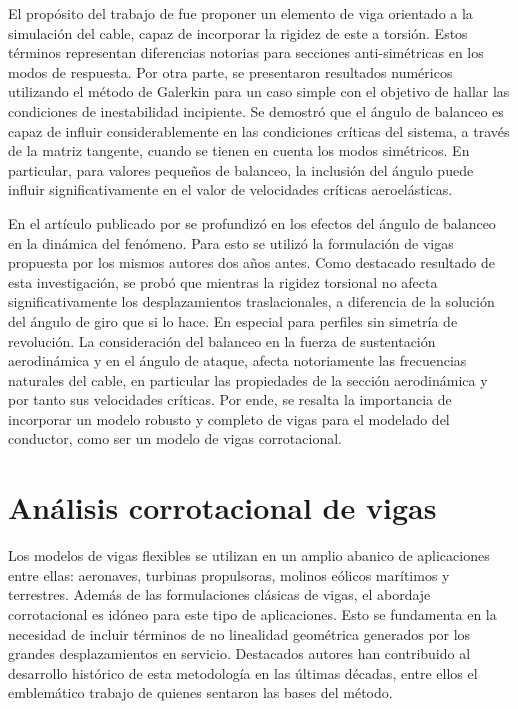 El propósito del trabajo de \cite{luongo2007linear} fue proponer un elemento de viga orientado a la simulación del cable, capaz de incorporar la rigidez de este a torsión. Estos términos representan diferencias notorias para secciones anti-simétricas en los modos de respuesta. Por otra parte, se presentaron resultados numéricos utilizando el método de Galerkin para un caso simple con el objetivo de hallar las condiciones de inestabilidad incipiente. Se demostró que el ángulo de balanceo es capaz de influir considerablemente en las condiciones críticas del sistema, a través de la matriz tangente, cuando se tienen en cuenta los modos simétricos. En particular, para valores pequeños de balanceo, la inclusión del ángulo puede influir significativamente en el valor de velocidades críticas aeroelásticas.

En el artículo publicado por \cite{luongo2009effect} se profundizó en los efectos del ángulo de balanceo en la dinámica del fenómeno. Para esto se utilizó la formulación de vigas propuesta por los mismos autores dos años antes. Como destacado resultado de esta investigación, se probó que mientras la rigidez torsional no afecta significativamente los desplazamientos traslacionales, a diferencia de la solución del ángulo de giro que si lo hace. En especial para perfiles sin simetría de revolución. La consideración del balanceo en la fuerza de sustentación aerodinámica y en el ángulo de ataque, afecta notoriamente las frecuencias naturales del cable, en particular las propiedades de la sección aerodinámica y por tanto sus velocidades críticas. Por ende, se resalta la importancia de incorporar un modelo robusto y completo de vigas para el modelado del conductor, como ser un modelo de vigas corrotacional.



\section{Análisis corrotacional de vigas}\label{Sec:EA:Corrotacional}
Los modelos de vigas flexibles se utilizan en un amplio abanico de aplicaciones entre ellas: aeronaves, turbinas propulsoras, molinos eólicos marítimos y terrestres. Además de las formulaciones clásicas de vigas, el abordaje corrotacional es idóneo para este tipo de aplicaciones. Esto se fundamenta en la necesidad de incluir términos de no linealidad geométrica generados por los grandes desplazamientos en servicio. Destacados autores han contribuido al desarrollo histórico de esta metodología en las últimas décadas, entre ellos el emblemático trabajo de \cite{Nour-Omid1991} quienes sentaron las bases del método. 

